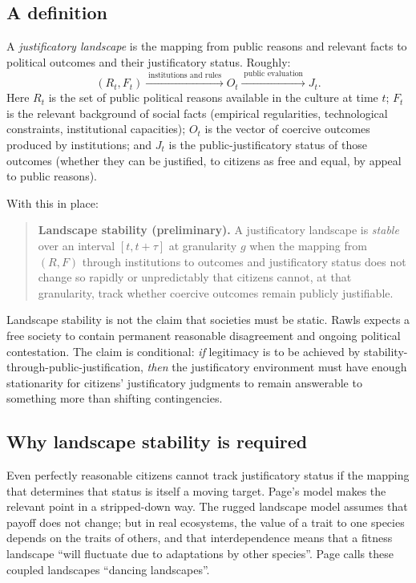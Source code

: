 \documentclass[12pt]{report}
\begin{document}
\subsection{A definition}

A \emph{justificatory landscape} is the mapping from public reasons and relevant facts to political outcomes and their justificatory status. Roughly:
\[
  (R_t, F_t) \xrightarrow{\;\text{institutions and rules}\; } O_t \xrightarrow{\;\text{public evaluation}\;} J_t.
\]
Here \(R_t\) is the set of public political reasons available in the culture at time \(t\); \(F_t\) is the relevant background of social facts (empirical regularities, technological constraints, institutional capacities); \(O_t\) is the vector of coercive outcomes produced by institutions; and \(J_t\) is the public-justificatory status of those outcomes (whether they can be justified, to citizens as free and equal, by appeal to public reasons).

With this in place:

\begin{quote}
\textbf{Landscape stability (preliminary).} A justificatory landscape is \emph{stable} over an interval \([t,t+\tau]\) at granularity \(g\) when the mapping from \((R,F)\) through institutions to outcomes and justificatory status does not change so rapidly or unpredictably that citizens cannot, at that granularity, track whether coercive outcomes remain publicly justifiable.
\end{quote}

Landscape stability is not the claim that societies must be static. Rawls expects a free society to contain permanent reasonable disagreement and ongoing political contestation.\parencite[p.~765]{rawls1997public} The claim is conditional: \emph{if} legitimacy is to be achieved by stability-through-public-justification, \emph{then} the justificatory environment must have enough stationarity for citizens’ justificatory judgments to remain answerable to something more than shifting contingencies.

\subsection{Why landscape stability is required}

Even perfectly reasonable citizens cannot track justificatory status if the mapping that determines that status is itself a moving target. Page’s model makes the relevant point in a stripped-down way. The rugged landscape model assumes that payoff does not change; but in real ecosystems, the value of a trait to one species depends on the traits of others, and that interdependence means that a fitness landscape \enquote{will fluctuate due to adaptations by other species}.\parencite[p.~94]{page2011diversity} Page calls these coupled landscapes \enquote{dancing landscapes}.\parencite[p.~94]{page2011diversity}
\end{document}
